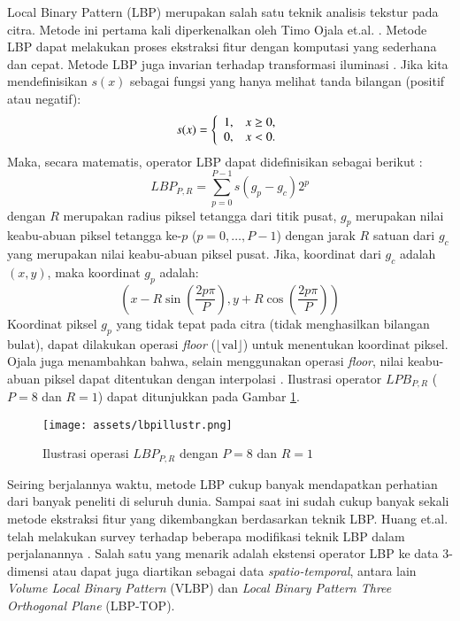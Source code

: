 \documentclass[review,3p,12pt]{elsarticle}
\begin{document}
Local Binary Pattern (LBP) merupakan salah satu teknik analisis tekstur pada citra. Metode ini pertama kali diperkenalkan oleh Timo Ojala et.al. \cite{ojala1996comparative}. Metode LBP dapat melakukan proses ekstraksi fitur dengan komputasi yang sederhana dan cepat. Metode LBP juga invarian terhadap transformasi iluminasi \cite{ojala2002multiresolution}. Jika kita mendefinisikan $s(x)$ sebagai fungsi yang hanya melihat tanda bilangan (positif atau negatif):
\begin{equation}
s(x) = \left\{
	\begin{array}{l l}
		1,& x \geq 0, \\
		0,& x < 0.
	\end{array}
	\right.
\end{equation}
Maka, secara matematis, operator LBP dapat didefinisikan sebagai berikut \cite{ojala2002multiresolution}:
\begin{equation}
LBP_{P,R} = \sum_{p=0}^{P-1} s(g_p - g_c) 2^p
\end{equation}
dengan $R$ merupakan radius piksel tetangga dari titik pusat, $g_p$ merupakan nilai keabu-abuan piksel tetangga ke-$p$ ($p = 0,\dots,P-1$) dengan jarak $R$ satuan dari $g_c$ yang merupakan nilai keabu-abuan piksel pusat. Jika, koordinat dari $g_c$ adalah $(x,y)$, maka koordinat $g_p$ adalah:
\begin{equation}
(x-R\sin(\frac{2p\pi}{P}), y+R\cos(\frac{2p\pi}{P}))
\end{equation}
Koordinat piksel $g_p$ yang tidak tepat pada citra (tidak menghasilkan bilangan bulat), dapat dilakukan operasi \textit{floor} ($\lfloor {\text{val}} \rfloor$) untuk menentukan koordinat piksel. Ojala juga menambahkan bahwa, selain menggunakan operasi \textit{floor}, nilai keabu-abuan piksel dapat ditentukan dengan interpolasi \cite{ojala2002multiresolution}. Ilustrasi operator $LPB_{P,R}$ ($P=8$ dan $R=1$) dapat ditunjukkan pada Gambar \ref{fig:lbpillustr}. 

\begin{figure}[hbt!]
\caption{Ilustrasi operasi $LBP_{P,R}$ dengan $P=8$ dan $R=1$}
\label{fig:lbpillustr}
\centering
	\texttt{[image: assets/lbpillustr.png]}
\end{figure}

Seiring berjalannya waktu, metode LBP cukup banyak mendapatkan perhatian dari banyak peneliti di seluruh dunia. Sampai saat ini sudah cukup banyak sekali metode ekstraksi fitur yang dikembangkan berdasarkan teknik LBP. Huang et.al. telah melakukan survey terhadap beberapa modifikasi teknik LBP dalam perjalanannya \cite{huang2011local}. Salah satu yang menarik adalah ekstensi operator LBP ke data 3-dimensi atau dapat juga diartikan sebagai data \textit{spatio-temporal}, antara lain \textit{Volume Local Binary Pattern} (VLBP) dan \textit{Local Binary Pattern Three Orthogonal Plane} (LBP-TOP).
\end{document}
